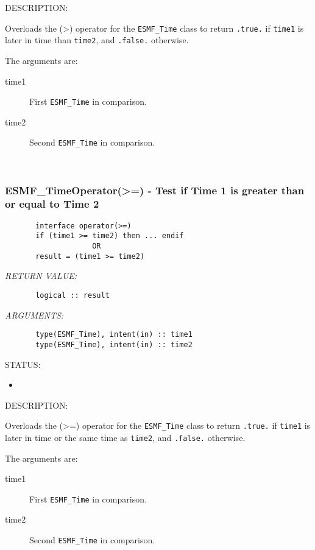 {\sf DESCRIPTION:\\ }


       Overloads the (>) operator for the {\tt ESMF\_Time} class to return 
       {\tt .true.} if {\tt time1} is later in time than {\tt time2}, and 
       {\tt .false.} otherwise.
  
       The arguments are:
       \begin{description}
       \item[time1]
            First {\tt ESMF\_Time} in comparison.
       \item[time2]
            Second {\tt ESMF\_Time} in comparison.
       \end{description}
   
 
\mbox{}\hrulefill\ 
 
\subsubsection [ESMF\_TimeOperator(>=)] {ESMF\_TimeOperator(>=) - Test if Time 1 is greater than or equal to Time 2}


  
\begin{verbatim}       interface operator(>=)
       if (time1 >= time2) then ... endif
                    OR
       result = (time1 >= time2)\end{verbatim}{\em RETURN VALUE:}
\begin{verbatim}       logical :: result\end{verbatim}{\em ARGUMENTS:}
\begin{verbatim}       type(ESMF_Time), intent(in) :: time1
       type(ESMF_Time), intent(in) :: time2\end{verbatim}
{\sf STATUS:}
   \begin{itemize}
   \item{}
   \end{itemize}
  
{\sf DESCRIPTION:\\ }


       Overloads the (>=) operator for the {\tt ESMF\_Time} class to return 
       {\tt .true.} if {\tt time1} is later in time or the same time as 
       {\tt time2}, and {\tt .false.} otherwise.
  
       The arguments are:
       \begin{description}
       \item[time1]
            First {\tt ESMF\_Time} in comparison.
       \item[time2]
            Second {\tt ESMF\_Time} in comparison.
       \end{description}
   
